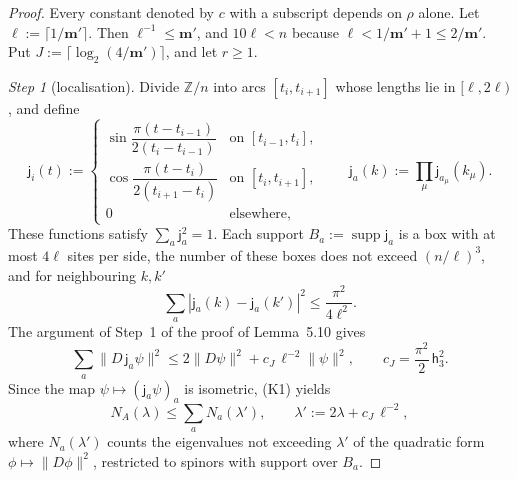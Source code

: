 \documentclass[11pt]{amsart}
\theoremstyle{definition}
\begin{document}
\begin{proof}
Every constant denoted by $c$ with a subscript depends on $\rho$ alone.
Let $\ell:=\lceil1/\mathbf m'\rceil$.
Then $\ell^{-1}\le\mathbf m'$, and $10\ell<n$ because $\ell<1/\mathbf m'+1\le2/\mathbf m'$.
Put $J:=\lceil\log_2(4/\mathbf m')\rceil$, and let $r\ge1$.

\emph{Step 1} (localisation).
Divide $\mathbb Z/n$ into arcs $[t_i,t_{i+1}]$ whose lengths lie in $[\ell,2\ell)$, and define
\begin{equation*}
\mathsf j_i(t):=\begin{cases}\sin\dfrac{\pi(t-t_{i-1})}{2(t_i-t_{i-1})}&\text{on }[t_{i-1},t_i],\\[2mm]\cos\dfrac{\pi(t-t_i)}{2(t_{i+1}-t_i)}&\text{on }[t_i,t_{i+1}],\\[1mm]0&\text{elsewhere,}\end{cases}\qquad\mathsf j_a(k):=\prod_\mu\mathsf j_{a_\mu}(k_\mu).
\end{equation*}
These functions satisfy $\sum_a\mathsf j_a^2=1$.
Each support $B_a:=\operatorname{supp}\mathsf j_a$ is a box with at most $4\ell$ sites per side, the number of these boxes does not exceed $(n/\ell)^3$, and for neighbouring $k,k'$
\begin{equation*}
\sum_a|\mathsf j_a(k)-\mathsf j_a(k')|^2\le\frac{\pi^2}{4\ell^2}.
\end{equation*}
The argument of Step~1 of the proof of Lemma~5.10 gives
\begin{equation*}
\sum_a\|D\,\mathsf j_a\psi\|^2\le2\|D\psi\|^2+c_J\,\ell^{-2}\|\psi\|^2,\qquad c_J=\frac{\pi^2}{2}\,\mathsf h_3^2.
\end{equation*}
Since the map $\psi\mapsto(\mathsf j_a\psi)_a$ is isometric, (K1) yields
\begin{equation*}
N_A(\lambda)\le\sum_aN_a(\lambda'),\qquad\lambda':=2\lambda+c_J\,\ell^{-2},
\end{equation*}
where $N_a(\lambda')$ counts the eigenvalues not exceeding $\lambda'$ of the quadratic form $\phi\mapsto\|D\phi\|^2$, restricted to spinors with support over $B_a$.


\end{proof}
\end{document}
